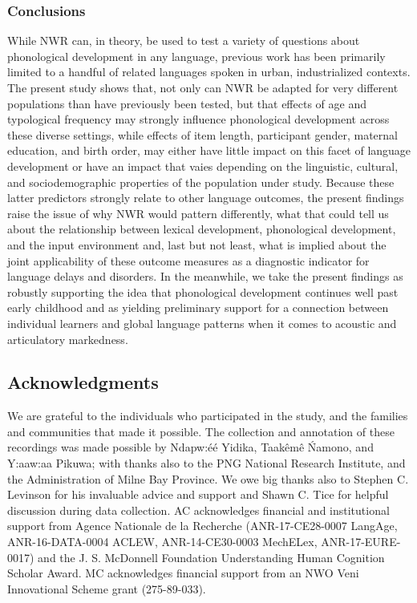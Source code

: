 \documentclass[english,,man,floatsintext]{apa6}
\begin{document}
\hypertarget{conclusions}{%
\subsubsection{Conclusions}\label{conclusions}}

While NWR can, in theory, be used to test a variety of questions about phonological development in any language, previous work has been primarily limited to a handful of related languages spoken in urban, industrialized contexts. The present study shows that, not only can NWR be adapted for very different populations than have previously been tested, but that effects of age and typological frequency may strongly influence phonological development across these diverse settings, while effects of item length, participant gender, maternal education, and birth order, may either have little impact on this facet of language development or have an impact that vaies depending on the linguistic, cultural, and sociodemographic properties of the population under study. Because these latter predictors strongly relate to other language outcomes, the present findings raise the issue of why NWR would pattern differently, what that could tell us about the relationship between lexical development, phonological development, and the input environment and, last but not least, what is implied about the joint applicability of these outcome measures as a diagnostic indicator for language delays and disorders. In the meanwhile, we take the present findings as robustly supporting the idea that phonological development continues well past early childhood and as yielding preliminary support for a connection between individual learners and global language patterns when it comes to acoustic and articulatory markedness.

\newpage

\hypertarget{acknowledgments}{%
\subsection{Acknowledgments}\label{acknowledgments}}

We are grateful to the individuals who participated in the study, and the families and communities that made it possible. The collection and annotation of these recordings was made possible by Ndapw:éé Yidika, Taakêmê Ńamono, and Y:aaw:aa Pikuwa; with thanks also to the PNG National Research Institute, and the Administration of Milne Bay Province. We owe big thanks also to Stephen C. Levinson for his invaluable advice and support and Shawn C. Tice for helpful discussion during data collection. AC acknowledges financial and institutional support from Agence Nationale de la Recherche (ANR-17-CE28-0007 LangAge, ANR-16-DATA-0004 ACLEW, ANR-14-CE30-0003 MechELex, ANR-17-EURE-0017) and the J. S. McDonnell Foundation Understanding Human Cognition Scholar Award. MC acknowledges financial support from an NWO Veni Innovational Scheme grant (275-89-033).
\end{document}
